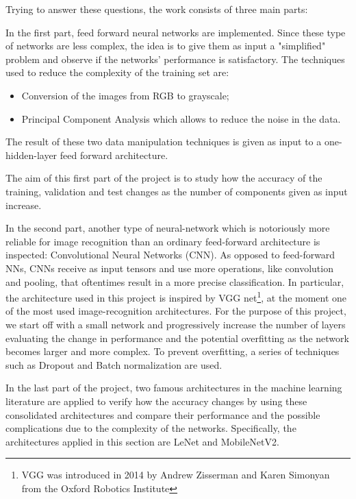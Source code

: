 \documentclass[10pt,english, openany]{book}
\begin{document}
Trying to answer these questions, the work consists of three main parts:

In the first part, feed forward neural networks are implemented.
Since these type of networks are less complex, the idea is to give them
as input a "simplified" problem and observe if the networks' performance is satisfactory.
The techniques used to reduce the complexity of the training set are:
\begin{itemize}
\item Conversion of the images from RGB to grayscale;		
	
\item Principal Component Analysis which allows to reduce the noise in the data.
\end{itemize}

The result of these two data manipulation techniques is given as input to a one-hidden-layer feed forward architecture.

The aim of this first part of the project is to study how the accuracy of the training, validation and test changes as the number of components
given as input increase.


In the second part, another type of neural-network which is notoriously more reliable for image recognition than an ordinary feed-forward architecture is inspected: Convolutional Neural Networks (CNN). 
As opposed to feed-forward NNs, CNNs receive as input tensors 
and use more operations, like convolution and pooling, that oftentimes result in a more precise classification.
In particular, the architecture used in this project is inspired by VGG net\footnote{VGG was introduced in 2014 by Andrew Zisserman and Karen Simonyan from the Oxford Robotics Institute}, at the moment one of the most used image-recognition architectures. For the purpose of this project, we start off with a small network and progressively increase the number of layers evaluating the change in performance and the potential overfitting
as the network becomes larger and more complex. To prevent overfitting, a series of techniques such as Dropout and Batch normalization are used.

In the last part of the project, two famous architectures in the machine learning literature are applied
to verify how the accuracy changes by using these consolidated architectures and compare their performance and the possible complications due to the complexity of the networks.
Specifically, the architectures applied in this section are LeNet and MobileNetV2.
\end{document}
